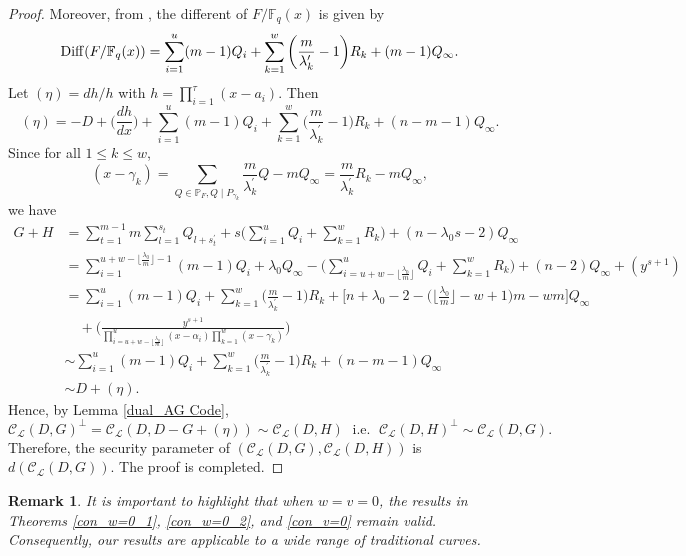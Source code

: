 \documentclass[journal,12pt,onecolumn]{IEEEtran}
\newtheorem{remark}[theorem]{Remark}
\begin{document}
\begin{proof}
    Moreover, from \cite[Chap. 3 and 4]{Algebraic_Function_Fields_and_Codes}, the different of $F/\mathbb{F}_q(x)$ is given by
    \[
        {\rm Diff}(F/\mathbb{F}_q(x)) = \sum_{i=1}^u(m-1)Q_i+ \sum_{k=1}^w\bigg(\frac{m}{\lambda_k^\prime}-1\bigg)R_k +(m-1)Q_\infty. 
    \]
    Let $(\eta) = dh/h$ with $h=\prod_{i=1}^\tau(x-a_i)$. Then
    \[
        (\eta) =  - D + \bigg(\frac{dh}{dx}\bigg) + \sum_{i=1}^u(m-1)Q_i+ \sum_{k=1}^w\bigg(\frac{m}{\lambda_k^\prime}-1\bigg)R_k +(n-m-1)Q_\infty.
    \]
    Since for all $1\le k \le w$, 
    \[
        (x-\gamma_k) = \sum_{Q\in\mathbb{P}_F,Q\mid P_{\gamma_k}} \frac{m}{\lambda_k^\prime}Q - mQ_\infty= \frac{m}{\lambda_k^\prime}R_k - mQ_\infty,
    \]
    we have
    \begin{align*}
        G+H & = \sum_{t=1}^{m-1}m\sum_{l=1}^{s_t}Q_{l+s_t^\prime} + s\bigg( \sum_{i=1}^uQ_i + \sum_{k=1}^wR_k \bigg) + (n-\lambda_0s-2)Q_\infty\\
        & = \sum_{i=1}^{u+w-\lfloor\frac{\lambda_0}{m}\rfloor-1}(m-1)Q_i + \lambda_0 Q_\infty - \bigg( \sum_{i=u+w-\lfloor\frac{\lambda_0}{m}\rfloor}^u Q_i + \sum_{k=1}^w R_k \bigg) + (n-2)Q_\infty + (y^{s+1}) \\
        & = \sum_{i=1}^u(m-1)Q_i + \sum_{k=1}^w\bigg(\frac{m}{\lambda_k^\prime}-1\bigg)R_k + \bigg[ n+\lambda_0 -2 - \bigg(\bigg\lfloor\frac{\lambda_0}{m}\bigg\rfloor-w+1\bigg)m - wm \bigg]Q_\infty \\
        &\quad + \bigg(\frac{y^{s+1}}{\prod_{i=u+w-\lfloor\frac{\lambda_0}{m}\rfloor}^u (x-\alpha_i)\prod_{k=1}^w(x- \gamma_k)}\bigg) \\
        & \sim \sum_{i=1}^u(m-1)Q_i + \sum_{k=1}^w\bigg(\frac{m}{\lambda_k^\prime}-1\bigg)R_k + (n-m-1)Q_\infty\\
        & \sim D + (\eta). 
    \end{align*}
    Hence, by Lemma \ref{dual_AG Code}, 
    \[
        \mathcal{C}_{\mathcal{L}}(D,G)^{\bot}=\mathcal{C}_{\mathcal{L}}(D,D-G+(\eta))\sim \mathcal{C}_{\mathcal{L}}(D,H)\;\text{ i.e. }\;\mathcal{C}_{\mathcal{L}}(D,H)^{\bot}\sim \mathcal{C}_{\mathcal{L}}(D,G).
    \]
    Therefore, the security parameter of $(\mathcal{C}_{\mathcal{L}}(D,G),\mathcal{C}_{\mathcal{L}}(D,H))$ is $d(\mathcal{C}_{\mathcal{L}}(D,G))$. The proof is completed. 
\end{proof}

\begin{remark}
    It is important to highlight that when $w=v=0$, the results in Theorems \ref{con_w=0_1}, \ref{con_w=0_2}, and \ref{con_v=0} remain valid. Consequently, our results are applicable to a wide range of traditional curves.
\end{remark}
\end{document}
